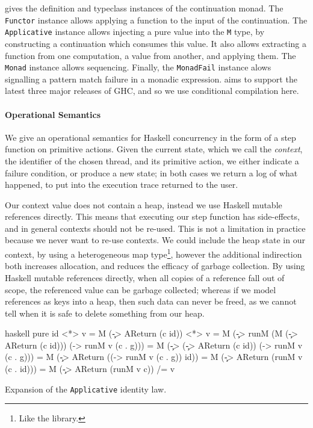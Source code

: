  gives the definition and typeclass instances of the \dejafu{}
continuation monad.  The \verb|Functor| instance allows applying a function to
the input of the continuation.  The \verb|Applicative| instance allows injecting
a pure value into the \verb|M| type, by constructing a continuation which
consumes this value.  It also allows extracting a function from one computation,
a value from another, and applying them.  The \verb|Monad| instance allows
sequencing.  Finally, the \verb|MonadFail| instance alows signalling a pattern
match failure in a monadic expression.  \dejafu{} aims to support the latest
three major releases of GHC, and so we use conditional compilation here.

\paragraph{Operational Semantics}
We give an operational semantics for Haskell concurrency in the form of a step
function on primitive actions.  Given the current state, which we call the
\emph{context}, the identifier of the chosen thread, and its primitive action,
we either indicate a failure condition, or produce a new state; in both cases we
return a log of what happened, to put into the execution trace returned to the
user.

Our context value does not contain a heap, instead we use Haskell mutable
references directly.  This means that executing our step function has
side-effects, and in general contexts should not be re-used.  This is not a
limitation in practice because we never want to re-use contexts.  We could
include the heap state in our context, by using a heterogeneous map
type\footnote{Like the  library.}, however the additional
indirection both increases allocation, and reduces the efficacy of garbage
collection.  By using Haskell mutable references directly, when all copies of a
reference fall out of scope, the referenced value can be garbage collected;
whereas if we model references as keys into a heap, then such data can never be
freed, as we cannot tell when it is safe to delete something from our heap.

\begin{listing}
\centering
\begin{cminted}{haskell}
pure id <*> v
  = M (\c -> AReturn (c id)) <*> v
  = M (\c -> runM (M (\c -> AReturn (c id))) (\g -> runM v (c . g)))
  = M (\c -> (\c -> AReturn (c id)) (\g -> runM v (c . g)))
  = M (\c -> AReturn ((\g -> runM v (c . g)) id))
  = M (\c -> AReturn (runM v (c . id)))
  = M (\c -> AReturn (runM v c))
 /= v
\end{cminted}
\caption{Expansion of the \texttt{Applicative} identity law.}\label{lst:areturn}
\end{listing}

